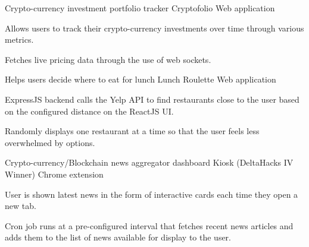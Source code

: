 


\begin{cventries}


\cventry
{Crypto-currency investment portfolio tracker} %
{Cryptofolio \href{https://github.com/kdelalic/Cryptofolio}{\faGithub}} %
{Web application}
{}
{ %
\begin{cvitems}
\item {Allows users to track their crypto-currency investments over time through various metrics.}
\item {Fetches live pricing data through the use of web sockets.}
\end{cvitems}
}


\cventry
{Helps users decide where to eat for lunch} %
{Lunch Roulette \href{https://github.com/kdelalic/lunch-roulette}{\faGithub}} %
{Web application}
{}
{ %
\begin{cvitems}
\item {ExpressJS backend calls the Yelp API to find restaurants close to the user based on the configured distance on the ReactJS UI.}
\item {Randomly displays one restaurant at a time so that the user feels less overwhelmed by options.}
\end{cvitems}
}


\cventry
{Crypto-currency/Blockchain news aggregator dashboard} %
{Kiosk (DeltaHacks IV Winner) \href{https://github.com/kdelalic/kiosk}{\faGithub}} %
{Chrome extension}
{}
{ %
\begin{cvitems}
\item {User is shown latest news in the form of interactive cards each time they open a new tab.}
\item {Cron job runs at a pre-configured interval that fetches recent news articles and adds them to the list of news available for display to the user.}
\end{cvitems}
}


\end{cventries}
